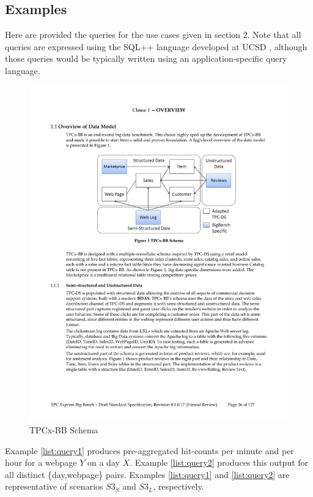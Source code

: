 \begin{appendices}
  
\section{Examples} \label{app:examples}
Here are provided the queries for the use cases given in section 2. Note that all queries are expressed using the SQL++ language developed at UCSD \cite{ong:2014aa}, although those queries would be typically written using an application-specific query language. 

\begin{figure}[h]
\label{fig:schema}
\centering
\caption{TPCx-BB Schema}
\includegraphics[width=\linewidth]{images/schema.pdf}
\end{figure}

Example \ref{list:query1} produces pre-aggregated hit-counts per minute and per hour for a webpage $Y$ on a day $X$. Example \ref{list:query2} produces this output for all distinct \{day,webpage\} pairs. Examples \ref{list:query1} and \ref{list:query2} are representative of scenarios $S3_S$ and $S3_L$, respectively.




\end{appendices}
